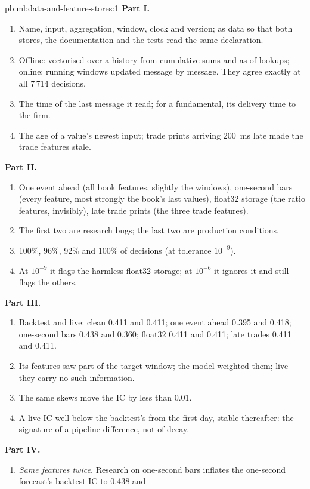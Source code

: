 \begin{solution}{pb:ml:data-and-feature-stores:1}
\textbf{Part I.}
\begin{enumerate}
\item Name, input, aggregation, window, clock and version; as data so that both stores, the documentation and the tests read the
same declaration.
\item Offline: vectorised over a history from cumulative sums and as-of lookups; online: running windows updated message by
message. They agree exactly at all 7\,714 decisions.
\item The time of the last message it read; for a fundamental, its delivery time to the firm.
\item The age of a value's newest input; trade prints arriving 200~ms late made the trade features stale.
\end{enumerate}
\textbf{Part II.}
\begin{enumerate}[resume]
\item One event ahead (all book features, slightly the windows), one-second bars (every feature, most strongly the book's last
values), float32 storage (the ratio features, invisibly), late trade prints (the three trade features).
\item The first two are research bugs; the last two are production conditions.
\item 100\%, 96\%, 92\% and 100\% of decisions (at tolerance $10^{-9}$).
\item At $10^{-9}$ it flags the harmless float32 storage; at $10^{-6}$ it ignores it and still flags the others.
\end{enumerate}
\textbf{Part III.}
\begin{enumerate}[resume]
\item Backtest and live: clean 0.411 and 0.411; one event ahead 0.395 and 0.418; one-second bars 0.438 and 0.360; float32 0.411
and 0.411; late trades 0.411 and 0.411.
\item Its features saw part of the target window; the model weighted them; live they carry no such information.
\item The same skews move the IC by less than 0.01.
\item A live IC well below the backtest's from the first day, stable thereafter: the signature of a pipeline difference, not of
decay.
\end{enumerate}
\textbf{Part IV.}
\begin{enumerate}[resume]
\item \emph{Same features twice.} Research on one-second bars inflates the one-second forecast's backtest IC to 0.438 and

\end{enumerate}
\end{solution}
